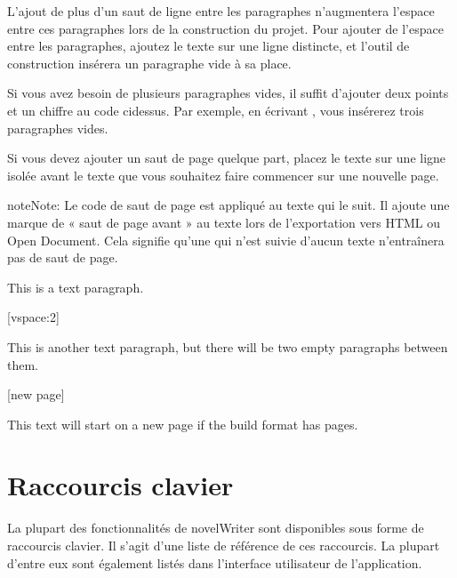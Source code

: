 \documentclass[a4paper,11pt,french]{sphinxmanual}
\begin{document}
\sphinxAtStartPar
L’ajout de plus d’un saut de ligne entre les paragraphes n’augmentera  l’espace entre ces paragraphes lors de la construction du projet. Pour ajouter de l’espace entre les paragraphes, ajoutez le texte \sphinxcode{\sphinxupquote{{[}vspace{]}}} sur une ligne distincte, et l’outil de construction insérera un paragraphe vide à sa place.

\sphinxAtStartPar
Si vous avez besoin de plusieurs paragraphes vides, il suffit d’ajouter deux points et un chiffre au code ci\sphinxhyphen{}dessus. Par exemple, en écrivant \sphinxcode{\sphinxupquote{{[}vspace:3{]}}}, vous insérerez trois paragraphes vides.

\sphinxAtStartPar
Si vous devez ajouter un saut de page quelque part, placez le texte  sur une ligne isolée avant le texte que vous souhaitez faire commencer sur une nouvelle page.

\begin{sphinxadmonition}{note}{Note:}
\sphinxAtStartPar
Le code de saut de page est appliqué au texte qui le suit. Il ajoute une marque de « saut de page avant » au texte lors de l’exportation vers HTML ou Open Document. Cela signifie qu’une  qui n’est suivie d’aucun texte n’entraînera pas de saut de page.
\end{sphinxadmonition}

\sphinxAtStartPar
{}

\begin{sphinxVerbatim}[commandchars=\\\{\}]
This is a text paragraph.

[vspace:2]

This is another text paragraph, but there will be two empty paragraphs
between them.

[new page]

This text will start on a new page if the build format has pages.
\end{sphinxVerbatim}

\sphinxstepscope


\chapter{Raccourcis clavier}
\label{\detokenize{usage_shortcuts:keyboard-shortcuts}}\label{\detokenize{usage_shortcuts:a-kb}}\label{\detokenize{usage_shortcuts::doc}}
\sphinxAtStartPar
La plupart des fonctionnalités de novelWriter sont disponibles sous forme de raccourcis clavier. Il s’agit d’une liste de référence de ces raccourcis. La plupart d’entre eux sont également listés dans l’interface utilisateur de l’application.
\end{document}

